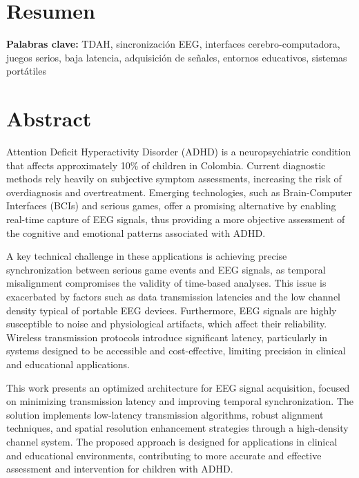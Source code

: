\newpage
\chapter*{\sffamily Resumen}
%
\par 

 

\textbf{Palabras clave:} TDAH, sincronización EEG, interfaces cerebro-computadora, juegos serios, baja latencia, adquisición de señales, entornos educativos, sistemas portátiles


\newpage 
\chapter*{\sffamily Abstract}
%
\par 

Attention Deficit Hyperactivity Disorder (ADHD) is a neuropsychiatric condition that affects approximately 10\% of children in Colombia. Current diagnostic methods rely heavily on subjective symptom assessments, increasing the risk of overdiagnosis and overtreatment. Emerging technologies, such as Brain-Computer Interfaces (BCIs) and serious games, offer a promising alternative by enabling real-time capture of EEG signals, thus providing a more objective assessment of the cognitive and emotional patterns associated with ADHD.

A key technical challenge in these applications is achieving precise synchronization between serious game events and EEG signals, as temporal misalignment compromises the validity of time-based analyses. This issue is exacerbated by factors such as data transmission latencies and the low channel density typical of portable EEG devices. Furthermore, EEG signals are highly susceptible to noise and physiological artifacts, which affect their reliability. Wireless transmission protocols introduce significant latency, particularly in systems designed to be accessible and cost-effective, limiting precision in clinical and educational applications.

This work presents an optimized architecture for EEG signal acquisition, focused on minimizing transmission latency and improving temporal synchronization. The solution implements low-latency transmission algorithms, robust alignment techniques, and spatial resolution enhancement strategies through a high-density channel system. The proposed approach is designed for applications in clinical and educational environments, contributing to more accurate and effective assessment and intervention for children with ADHD.

